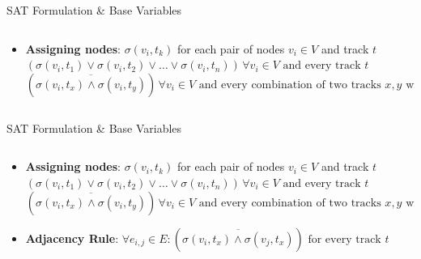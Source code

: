 \documentclass[hyperref={pdfpagelabels=false},aspectratio=169]{beamer}
\theoremstyle{definition}
\begin{document}
\begin{frame}{SAT Formulation \& Base Variables}
    \begin{columns}
        \begin{column}{1\textwidth}
            \begin{itemize}
            \item \textbf{Assigning nodes}: $\sigma(v_i,t_k)$ for each pair of nodes $v_i \in V$ and track $t$
            \newline
            \newline
            \cdot  \, $ (\sigma(v_i,t_1) \lor \sigma(v_i,t_2) \lor \dots \lor \sigma(v_i,t_n)) \, \forall v_i \in V \text{ and every track }t $
            \newline
            \newline
            \cdot  \, $ (\overline{\sigma(v_i, t_x) \land \sigma(v_i, t_y)}) \, \forall v_i \in V \text{ and every combination of two tracks } x, y \text{ with } x \neq y$
            \end{itemize}
        \end{column}
    \end{columns}
\end{frame}

\begin{frame}{SAT Formulation \& Base Variables}
    \begin{columns}
        \begin{column}{1\textwidth}
            \begin{itemize}
            \item \textbf{Assigning nodes}: $\sigma(v_i,t_k)$ for each pair of nodes $v_i \in V$ and track $t$
            \newline
            \newline
            \cdot  \, $ (\sigma(v_i,t_1) \lor \sigma(v_i,t_2) \lor \dots \lor \sigma(v_i,t_n)) \, \forall v_i \in V \text{ and every track }t $
            \newline
            \newline
            \cdot  \, $ (\overline{\sigma(v_i, t_x) \land \sigma(v_i, t_y)}) \, \forall v_i \in V \text{ and every combination of two tracks } x, y \text{ with } x \neq y$
            \newline
            \item \textbf{Adjacency Rule}: $ \forall e_{i,j} \in E : (\overline{\sigma(v_i,t_x) \land \sigma(v_j,t_x)}) \text{ for every track } t $
            \end{itemize}
        \end{column}
    \end{columns}
\end{frame}
\end{document}
